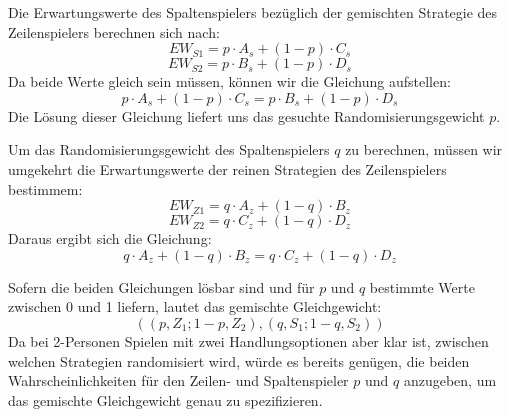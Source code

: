 Die Erwartungswerte des Spaltenspielers bezüglich der gemischten Strategie
des Zeilenspielers berechnen sich nach:
\[ EW_{S1} = p \cdot A_s + (1-p) \cdot C_s \]
\[ EW_{S2} = p \cdot B_s + (1-p) \cdot D_s \]
Da beide Werte gleich sein müssen, können wir die Gleichung aufstellen:
\[ p \cdot A_s + (1-p) \cdot C_s = p \cdot B_s + (1-p) \cdot D_s \]
Die Lösung dieser Gleichung liefert uns das gesuchte Randomisierungsgewicht $p$.

Um das Randomisierungsgewicht des Spaltenspielers $q$ zu berechnen, müssen wir
umgekehrt die Erwartungswerte der reinen Strategien des Zeilenspielers
bestimmem:
\[ EW_{Z1} = q \cdot A_z + (1-q) \cdot B_z \]
\[ EW_{Z2} = q \cdot C_z + (1-q) \cdot D_z \]
Daraus ergibt sich die Gleichung:
\[ q \cdot A_z + (1-q) \cdot B_z = q \cdot C_z + (1-q) \cdot D_z \]

Sofern die beiden Gleichungen lösbar sind und für $p$ und $q$ bestimmte Werte
zwischen 0 und 1 liefern, lautet das gemischte Gleichgewicht: 
\[ ( (p,Z_1; 1-p,Z_2), (q,S_1; 1-q,S_2) ) \]
Da bei 2-Personen Spielen mit zwei Handlungsoptionen aber klar ist, zwischen
welchen Strategien randomisiert wird, würde es bereits genügen, die beiden
Wahrscheinlichkeiten für den Zeilen- und Spaltenspieler $p$ und $q$ anzugeben,
um das gemischte Gleichgewicht genau zu spezifizieren.

